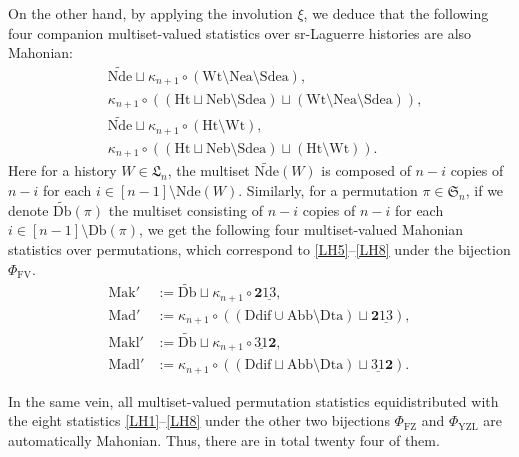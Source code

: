\documentclass[12pt]{amsart}
\numberwithin{equation}{section}
\theoremstyle{plain}
\theoremstyle{definition}
\def\FV{\mathrm{FV}}
\def\FZ{\mathrm{FZ}}
\def\YZL{\mathrm{YZL}}
\def\SS{\mathfrak{S}}
\def\LH{\mathfrak{L}}
\def\Neb{\mathrm{Neb}}
\def\Nea{\mathrm{Nea}}
\def\Sdea{\mathrm{Sdea}}
\def\Nde{\mathrm{Nde}}
\def\Het{\mathrm{Ht}}
\def\Wt{\mathrm{Wt}}
\def\Db{\mathrm{Db}}
\def\Ddif{\mathrm{Ddif}}
\def\Dta{\mathrm{Dta}}
\def\Abb{\mathrm{Abb}}
\def\rightascent{{\mathbf{2}\underline{13}}}
\def\leftdescent{\mathrm{\underline{31}}\mathbf{2}}
\def\Mak{\mathrm{Mak}}
\def\Mad{\mathrm{Mad}}
\def\Makl{\mathrm{Makl}}
\def\Madl{\mathrm{Madl}}
\begin{document}
On the other hand, by applying the involution $\xi$, we deduce that the following four companion multiset-valued statistics over sr-Laguerre histories are also Mahonian:
\begin{align}
\label{LH5} &\widetilde{\Nde }\sqcup \kappa_{n+1}\circ(\Wt \setminus \Nea \setminus \Sdea),\\
\label{LH6} &\kappa_{n+1}\circ((\Het \sqcup \Neb \setminus \Sdea)\sqcup (\Wt \setminus
\Nea \setminus \Sdea)),  \\
\label{LH7} &\widetilde{\Nde } \sqcup \kappa_{n+1}\circ(\Het \setminus \Wt),\\
\label{LH8} &\kappa_{n+1}\circ((\Het \sqcup \Neb \setminus \Sdea) \sqcup (\Het \setminus \Wt)).
\end{align}
Here for a history $W\in\LH_n$, the multiset $\widetilde{\Nde}(W)$ is composed of $n-i$ copies of $n-i$ for each $i \in [n-1]\setminus\Nde(W)$. Similarly, for a permutation $\pi\in\SS_n$, if we denote $\widetilde{\Db}(\pi)$ the multiset consisting of $n-i$ copies of $n-i$ for each $i\in[n-1]\setminus\Db(\pi)$, we get the following four multiset-valued Mahonian statistics over permutations, which correspond to \eqref{LH5}--\eqref{LH8} under the bijection $\Phi_{\FV}$.
\begin{align*}
\Mak' &:=\widetilde{\Db} \sqcup \kappa_{n+1}\circ\rightascent,\\
\Mad' &:=\kappa_{n+1}\circ((\Ddif\cup\Abb\setminus\Dta) \sqcup \rightascent),\\
\Makl' &:=\widetilde{\Db} \sqcup \kappa_{n+1}\circ\leftdescent,\\
\Madl' &:=\kappa_{n+1}\circ((\Ddif\sqcup\Abb\setminus\Dta) \sqcup \leftdescent).
\end{align*}

In the same vein, all multiset-valued permutation statistics equidistributed with the eight statistics \eqref{LH1}--\eqref{LH8} under the other two bijections $\Phi_{\FZ}$ and $\Phi_{\YZL}$ are automatically Mahonian. Thus, there are in total twenty four of them.
\end{document}
